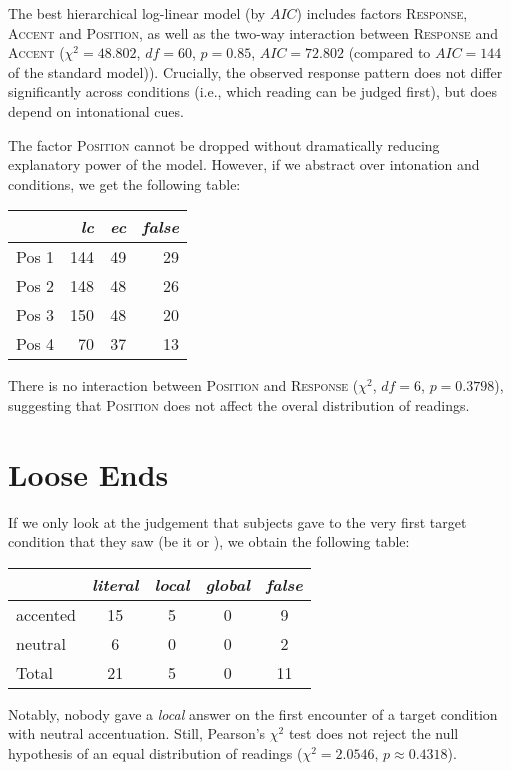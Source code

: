 \documentclass[fleqn,reqno,10pt]{article}
\newcommand{\as}{\acro{as}}
\renewcommand{\es}{\acro{es}}
\begin{document}
The best hierarchical log-linear model (by $AIC$) includes factors
\textsc{Response}, \textsc{Accent} and \textsc{Position}, as well as
the two-way interaction between \textsc{Response} and \textsc{Accent}
($\chi^2 = 48.802$, $df=60$, $p=0.85$, $AIC=72.802$ (compared to
$AIC=144$ of the standard model)). Crucially, the observed response
pattern does not differ significantly across conditions (i.e., which
reading can be judged first), but does depend on intonational cues.

The factor \textsc{Position} cannot be dropped without dramatically
reducing explanatory power of the model. However, if we abstract over
intonation and conditions, we get the following table:
\begin{center}
\centering
\begin{tabular}{rrrr}
  & \emph{lc} & \emph{ec} & \emph{false} \\ 
  \midrule
  Pos 1 & 144 & 49 & 29 \\ 
  Pos 2 & 148 & 48 & 26 \\ 
  Pos 3 & 150 & 48 & 20 \\ 
  Pos 4 &  70 & 37 & 13 \\ 
\end{tabular}
\end{center}
There is no interaction between \textsc{Position} and
\textsc{Response} ($\chi^2$, $df=6$, $p=0.3798$), suggesting that
\textsc{Position} does not affect the overal distribution of readings.

\newpage

\section{Loose Ends}
\label{sec:loose-ends}

If we only look at the judgement that subjects gave to the very first
target condition that they saw (be it \as or \es), we obtain the
following table:
\begin{center}
\begin{tabular}{lcccc}
    & \emph{literal} & \emph{local} & \emph{global} & \emph{false} \\
    \midrule
    accented & 15 &  5 & 0 &  9 \\
    neutral  &  6 &  0 & 0 &  2 \\ \addlinespace[0.15cm]
    Total    & 21 &  5 & 0 & 11
\end{tabular}
\end{center}
Notably, nobody gave a \emph{local} answer on the first encounter of a
target condition with neutral accentuation. Still, Pearson's $\chi^2$
test does not reject the null hypothesis of an equal distribution of
readings ($\chi^2 = 2.0546$, $p \approx 0.4318$).  

\printbibliography[heading=bibintoc]
\end{document}
